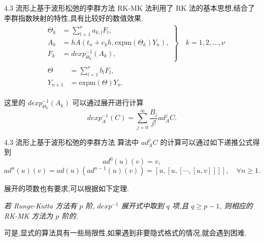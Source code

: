 \documentclass{beamer}
\begin{document}
\begin{frame}{4.3 流形上基于波形松弛的李群方法}
\qquad RK-MK 法利用了 RK 法的基本思想,结合了李群指数映射的特性,具有比较好的数值效果.
\begin{equation*}
	\begin{aligned}
		&\left.\begin{aligned}
		\Theta_k&=\sum_{l=1}^{\nu}a_{k,l}F_l,\\
		A_k&=hA(t_n+c_kh,\mbox{expm}(\Theta_k)Y_n),\\
		F_k&=dexp_{\Theta_k}^{-1}(A_k),
	\end{aligned}\right\rbrace \quad k=1,2,\ldots,\nu\\
		&\begin{aligned}
		\Theta&=\sum_{l=1}^{\nu}b_lF_l,\\
		Y_{n+1}&=\mbox{expm}(\Theta)Y_n.
	\end{aligned}
	\end{aligned}
\end{equation*}

这里的 $dexp_{\Theta_k}^{-1}(A_k)$ 可以通过展开进行计算
\begin{equation*}
	dexp_A^{-1}(C)=\sum_{j=0}^{\infty}\frac{B_j}{j!}ad^j_AC.
\end{equation*}
\end{frame}

\begin{frame}{4.3 流形上基于波形松弛的李群方法}
\qquad 算法中 $ad^j_AC$ 的计算可以通过如下递推公式得到
\begin{equation*}
	ad^0(u)(v)=v,
\end{equation*}
\begin{equation*}
	ad^n(u)(v)=ad(u)(ad^{n-1}(u)(v))=[u,[u,[\cdots,[u,v]]]],\quad \forall n \geq 1.
\end{equation*}

\qquad 展开的项数也有要求,可以根据如下定理.
\begin{theorem}
	\emph{若 Runge-Kutta 方法有 $p$ 阶, $dexp^{-1}$ 展开式中取到 $q$ 项,且 $q\geq p-1$, 则相应的 RK-MK 方法为 $p$ 阶的.}
\end{theorem}

\qquad 可是,显式的算法具有一些局限性,如果遇到非要隐式格式的情况,就会遇到困难.
\end{frame}
\end{document}
